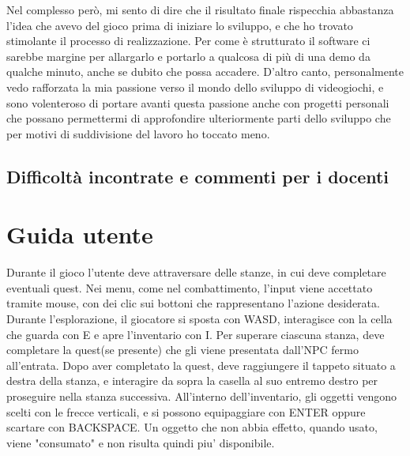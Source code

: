 \documentclass[a4paper,12pt]{report}
\begin{document}
\newline Nel complesso però, mi sento di dire che il risultato finale rispecchia abbastanza l'idea che avevo del gioco prima di iniziare lo sviluppo, e che ho trovato stimolante il processo di realizzazione. Per come è strutturato il software ci sarebbe margine per allargarlo e portarlo a qualcosa di più di una demo da qualche minuto, anche se dubito che possa accadere. D'altro canto, personalmente vedo rafforzata la mia passione verso il mondo dello sviluppo di videogiochi, e sono volenteroso di portare avanti questa passione anche con progetti personali che possano permettermi di approfondire ulteriormente parti dello sviluppo che per motivi di suddivisione del lavoro ho toccato meno.

\section{Difficoltà incontrate e commenti per i docenti}

\appendix
\chapter{Guida utente}

Durante il gioco l'utente deve attraversare delle stanze, in cui deve completare eventuali quest.
\newline Nei menu, come nel combattimento, l'input viene accettato tramite mouse, con dei clic sui bottoni che rappresentano l'azione desiderata.
\newline Durante l'esplorazione, il giocatore si sposta con WASD, interagisce con la cella che guarda con E e apre l'inventario con I.
\newline Per superare ciascuna stanza, deve completare la quest(se presente) che gli viene presentata dall'NPC fermo all'entrata. Dopo aver completato la quest, deve raggiungere il tappeto situato a destra della stanza, e interagire da sopra la casella al suo entremo destro per proseguire nella stanza successiva.
\newline All'interno dell'inventario, gli oggetti vengono scelti con le frecce verticali, e si possono equipaggiare con ENTER oppure scartare con BACKSPACE. Un oggetto che non abbia effetto, quando usato, viene "consumato" e non risulta quindi piu' disponibile.



\end{document}
